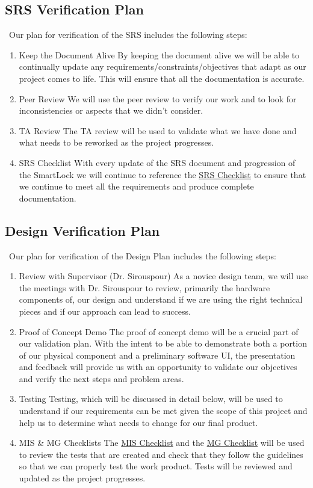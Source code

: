 \documentclass[12pt, titlepage]{article}
\begin{document}
\subsection{SRS Verification Plan}
\-\
Our plan for verification of the SRS includes the following steps:
\begin{enumerate}
\item Keep the Document Alive
\subitem By keeping the document alive we will be able to continually update any requirements/constraints/objectives that adapt as our project comes to life.  This will ensure that all the documentation is accurate. 
\item Peer Review
\subitem We will use the peer review to verify our work and to look for inconsistencies or aspects that we didn't consider.
\item TA Review
\subitem The TA review will be used to validate what we have done and what needs to be reworked as the project progresses.
\item SRS Checklist
\subitem With every update of the SRS document and progression of the SmartLock we will continue to reference the  \href{https://github.com/NevoAbigail/Capstone/blob/main/docs/Checklists/SRS-Checklist.pdf}{SRS Checklist} to ensure that we continue to meet all the requirements and produce complete documentation.
\end{enumerate}

\subsection{Design Verification Plan}
\-\
Our plan for verification of the Design Plan includes the following steps:
\begin{enumerate}
\item Review with Supervisor (Dr. Sirouspour)
\subitem As a novice design team, we will use the meetings with Dr. Sirouspour to review, primarily the hardware components of, our design and understand if we are using the right technical pieces and if our approach can lead to success. 
\item Proof of Concept Demo
\subitem The proof of concept demo will be a crucial part of our validation plan.  With the intent to be able to demonstrate both a portion of our physical component and a preliminary software UI, the presentation and feedback will provide us with an opportunity to validate our objectives and verify the next steps and problem areas.
\item Testing
\subitem Testing, which will be discussed in detail below, will be used to understand if our requirements can be met given the scope of this project and help us to determine what needs to change for our final product.
\item MIS \& MG Checklists
\subitem The \href{https://github.com/NevoAbigail/Capstone/blob/main/docs/Checklists/MIS-Checklist.pdf}{MIS Checklist} and the
 \href{https://github.com/NevoAbigail/Capstone/blob/main/docs/Checklists/MG-Checklist.pdf}{MG Checklist} will be used to review the tests that are created and check that they follow the guidelines so that we can properly test the work product. Tests will be reviewed and updated as the project progresses.
\end{enumerate}
\end{document}
